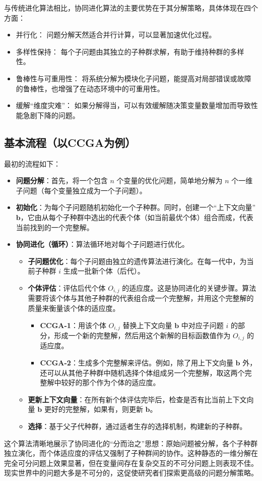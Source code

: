 与传统进化算法相比，协同进化算法的主要优势在于其分解策略，具体体现在四个方面：
\begin{itemize}
\item 并行化： 问题分解天然适合并行计算，可以显著加速优化过程。
\item 多样性保持： 每个子问题由其独立的子种群求解，有助于维持种群的多样性。
\item 鲁棒性与可重用性： 将系统分解为模块化子问题，能提高对局部错误或故障的鲁棒性，也增强了在动态环境中的可重用性。
\item 缓解“维度灾难”： 如果分解得当，可以有效缓解随决策变量数量增加而导致性能急剧下降的问题。
\end{itemize}

\subsection{基本流程（以CCGA为例）}
最初的流程如下：
\begin{itemize}
    \item \textbf{问题分解}：首先，将一个包含 $n$ 个变量的优化问题，简单地分解为 $n$ 个一维子问题（每个变量独立成为一个子问题）。
    \item \textbf{初始化}：为每个子问题随机初始化一个子种群。同时，创建一个“上下文向量” $\mathbf{b}$，它由从每个子种群中选出的代表个体（如当前最优个体）组合而成，代表当前找到的一个完整解。
    \item \textbf{协同进化（循环）}：算法循环地对每个子问题进行优化。
    \begin{itemize}
        \item \textbf{子问题优化}：每个子问题由独立的遗传算法进行演化。在每一代中，为当前子种群 $i$ 生成一批新个体（后代）。
        \item \textbf{个体评估}：评估后代个体 $O_{i,j}$ 的适应度。这是协同进化的关键步骤。算法需要将该个体与其他子种群的代表组合成一个完整解，并用这个完整解的质量来衡量该个体的适应度。
        \begin{itemize}
            \item \textbf{CCGA-1}：用该个体 $O_{i,j}$ 替换上下文向量 $\mathbf{b}$ 中对应子问题 $i$ 的部分，形成一个新的完整解，然后用这个新解的目标函数值作为 $O_{i,j}$ 的适应度。
            \item \textbf{CCGA-2}：生成多个完整解来评估。例如，除了用上下文向量 $\mathbf{b}$ 外，还可以从其他子种群中随机选择个体组成另一个完整解，取这两个完整解中较好的那个作为个体的适应度。
        \end{itemize}
        \item \textbf{更新上下文向量}：在所有新个体评估完毕后，检查是否有比当前上下文向量 $\mathbf{b}$ 更好的完整解，如果有，则更新 $\mathbf{b}$。
        \item \textbf{选择}：基于父子代种群，通过适者生存的选择机制，构建新的子种群。
    \end{itemize}
\end{itemize}
这个算法清晰地展示了协同进化的“分而治之”思想：原始问题被分解，各个子种群独立演化，而个体适应度的评估又强制了子种群间的协作。这种静态的一维分解在完全可分问题上效果显著，但在变量间存在复杂交互的不可分问题上则表现不佳。现实世界中的问题大多是不可分的，这促使研究者们探索更高级的问题分解策略。

